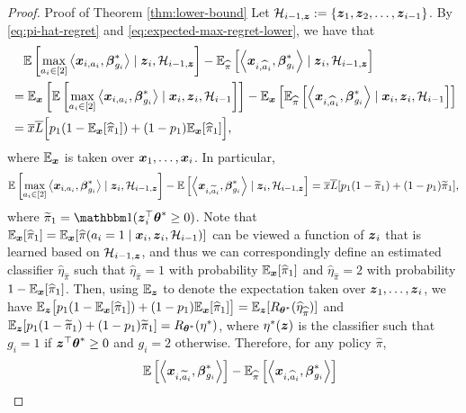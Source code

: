 \begin{proof}{Proof of Theorem \ref{thm:lower-bound}}
Let ${\cal H}_{i-1, \boldsymbol{z}}:=\{\boldsymbol{z}_{1}, \boldsymbol{z}_{2}, \dots, \boldsymbol{z}_{i-1}\}$. 
By \eqref{eq:pi-hat-regret} and \eqref{eq:expected-max-regret-lower}, we have that 
\begin{align*}
	&\quad \mathbb{E}\left[\max_{a_i \in [2]}\left\langle \boldsymbol{x}_{i,a_i}, \boldsymbol{\beta}^*_{g_i} \right\rangle \mid \boldsymbol{z}_i,  {\cal H}_{i-1, \boldsymbol{z}}\right] - \mathbb{E}_{\widehat\pi}\left[\left\langle \boldsymbol{x}_{i,\widehat{a}_i}, \boldsymbol{\beta}^*_{g_i} \right\rangle \mid  \boldsymbol{z}_i,  {\cal H}_{i-1, \boldsymbol{z}}\right] \\
		&=\mathbb{E}_{\boldsymbol{x}}\left[\mathbb{E}\left[\max_{a_i \in [2]}\left\langle \boldsymbol{x}_{i,a_i}, \boldsymbol{\beta}^*_{g_i} \right\rangle \mid \boldsymbol{x}_i, \boldsymbol{z}_i, {\cal H}_{i-1}\right]\right] - \mathbb{E}_{\boldsymbol{x}}\left[\mathbb{E}_{\widehat\pi}\left[\left\langle \boldsymbol{x}_{i,\widehat{a}_i}, \boldsymbol{\beta}^*_{g_i} \right\rangle \mid  \boldsymbol{x}_i, \boldsymbol{z}_i, {\cal H}_{i-1} \right]\right] \\
		&= \overline{x}\overline{L}\Big[p_1(1-\mathbb{E}_{\boldsymbol{x}}[\widehat\pi_1])+(1-p_1)\mathbb{E}_{\boldsymbol{x}}[\widehat\pi_1]\Big],
\end{align*}
where $\mathbb{E}_{\boldsymbol{x}}$ is taken over $\boldsymbol{x}_1,\dots, \boldsymbol{x}_{i}$. In particular,
\[	\mathbb{E}\left[\max_{a_i \in [2]}\left\langle \boldsymbol{x}_{i,a_i}, \boldsymbol{\beta}^*_{g_i} \right\rangle \mid   \boldsymbol{z}_i, {\cal H}_{i-1,\boldsymbol{z}}\right] - \mathbb{E}\left[\left\langle \boldsymbol{x}_{i,\widetilde{a}_i}, \boldsymbol{\beta}^*_{g_i} \right\rangle \mid \boldsymbol{z}_i, {\cal H}_{i-1,\boldsymbol{z}} \right] = \overline{x}\overline{L}[p_1(1-\widetilde\pi_1)+(1-p_1)\widetilde\pi_1],\]
where $\widetilde\pi_1=\one(\bz_i^{\top}\btheta^* \geq 0)$. Note that $\mathbb{E}_{\boldsymbol{x}}[\widehat\pi_1]=\mathbb{E}_{\boldsymbol{x}}[\widehat\pi(a_i=1 \mid \boldsymbol{x}_i, \boldsymbol{z}_i, {\cal H}_{i-1})]$ can be viewed a function of $\boldsymbol{z}_i$ that is learned based on ${\cal H}_{i-1, \boldsymbol{z}}$, and thus we can correspondingly define an estimated classifier $\hat\eta_{\hat\pi}$ such that $\hat\eta_{\hat\pi}=1$ with probability $\mathbb{E}_{\boldsymbol{x}}[ \widehat\pi_1]$ and $\hat\eta_{\hat\pi}=2$ with probability $1-\mathbb{E}_{\boldsymbol{x}}[\widehat\pi_1]$. Then, using $\mathbb{E}_{\boldsymbol{z}}$ to denote the expectation taken over $\boldsymbol{z}_1,\dots, \boldsymbol{z}_{i}$, we have $\mathbb{E}_{\boldsymbol{z}}\big[p_1(1-\mathbb{E}_{\boldsymbol{x}}[\widehat\pi_1])+(1-p_1)\mathbb{E}_{\boldsymbol{x}}[\widehat\pi_1]\big]=\mathbb{E}_{\boldsymbol{z}}[R_{\boldsymbol{\theta}^*}(\widehat\eta_{\widehat\pi})]$ and $\mathbb{E}_{\boldsymbol{z}}[p_1(1-\widetilde\pi_1)+(1-p_1)\widetilde\pi_1]=R_{\boldsymbol{\theta}^*}(\eta^*)$, where $\eta^*(\boldsymbol{z})$ is the classifier such that $g_i=1$ if $\boldsymbol{z}^{\top}\boldsymbol{\theta}^*\geq 0$ and $g_i=2$ otherwise. Therefore, for any policy $\hat\pi$, 
\begin{align*}
	&\quad \EE \left[\angles{\bx_{i, \widetilde{a}_i}, \bbeta^*_{g_i}}\right] - \EE_{\hat\pi} \left[\angles{\bx_{i, \widehat{a}_i}, \bbeta^*_{g_i}}\right]\\

\end{align*}
\end{proof}
